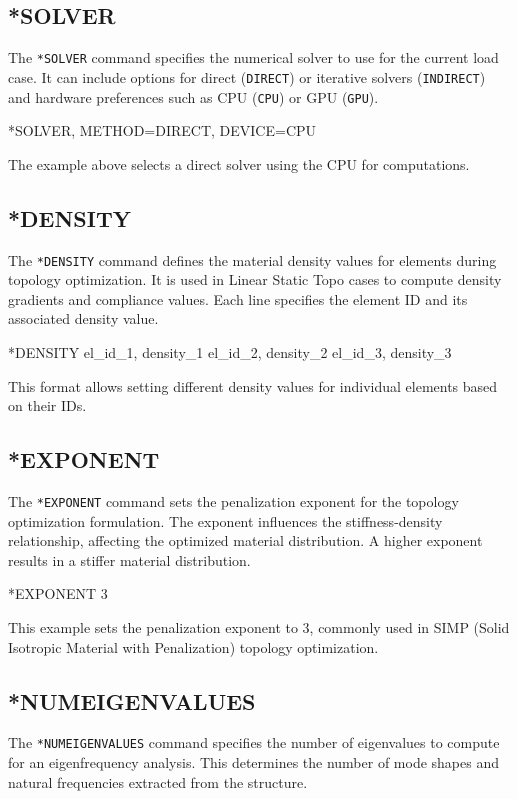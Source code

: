 \subsection{*SOLVER}
The \texttt{*SOLVER} command specifies the numerical solver to use for the current load case.
It can include options for direct (\texttt{DIRECT}) or iterative solvers (\texttt{INDIRECT}) and hardware preferences such as CPU (\texttt{CPU}) or GPU (\texttt{GPU}).

\begin{codeBlock}
*SOLVER, METHOD=DIRECT, DEVICE=CPU
\end{codeBlock}

The example above selects a direct solver using the CPU for computations.

\subsection{*DENSITY}
The \texttt{*DENSITY} command defines the material density values for elements during topology optimization. It is used in Linear Static Topo cases to compute density gradients and compliance values. Each line specifies the element ID and its associated density value.

\begin{codeBlock}
*DENSITY
el_id_1, density_1
el_id_2, density_2
el_id_3, density_3
\end{codeBlock}

This format allows setting different density values for individual elements based on their IDs.

\subsection{*EXPONENT}
The \texttt{*EXPONENT} command sets the penalization exponent for the topology optimization formulation. The exponent influences the stiffness-density relationship, affecting the optimized material distribution. A higher exponent results in a stiffer material distribution.

\begin{codeBlock}
*EXPONENT
3
\end{codeBlock}

This example sets the penalization exponent to 3, commonly used in SIMP (Solid Isotropic Material with Penalization) topology optimization.

\subsection{*NUMEIGENVALUES}
The \texttt{*NUMEIGENVALUES} command specifies the number of eigenvalues to compute for an eigenfrequency analysis. This determines the number of mode shapes and natural frequencies extracted from the structure.

